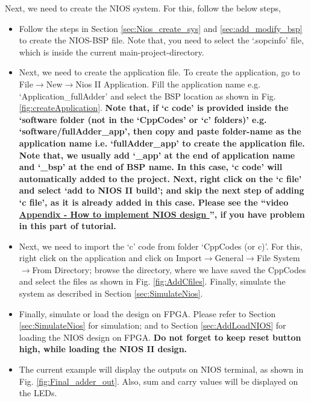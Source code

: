 Next, we need to create the NIOS system. For this, follow the below steps, 
\begin{itemize}
	\item Follow the steps in Section \ref{sec:Nios_create_sys} and \ref{sec:add_modify_bsp} to create the NIOS-BSP file. Note that, you need to select the `.sopcinfo' file, which is inside the current main-project-directory.  

	\item Next, we need to create the application file. To create the application, go to File$\rightarrow$New$\rightarrow$Nios II Application. Fill the application name e.g. `Application\_fullAdder' and select the BSP location as shown in Fig. \ref{fig:createApplication}. \textbf{Note that, if `c code' is provided inside the `software folder (not in the `CppCodes' or `c' folders)' e.g. `software/fullAdder\_app', then copy and paste folder-name as the application name i.e. `fullAdder\_app' to create the application file. Note that, we usually add `\_app' at the end of application name and `\_bsp' at the end of BSP name. In this case, `c code' will automatically added to the project. Next, right click on the `c file' and select `add to NIOS II build'; and skip the next step of adding `c file', as it is already added in this case. Please see the ``video \href{https://www.youtube.com/playlist?list=PLpqu8JfoNKiNJpFvKTeBlI-LMzc2TAlRM}{Appendix - How to implement NIOS design }'', if you have problem in this part of tutorial.}
	

	\item Next, we need to import the `c' code from folder `CppCodes (or c)'. For this, right click on the application and click on Import$\rightarrow$General$\rightarrow$File System$\rightarrow$From Directory; browse the directory, where we have saved  the CppCodes  and select the files as shown in Fig. \ref{fig:AddCfiles}. Finally, simulate the system as described in Section \ref{sec:SimulateNios}.
	
	\item Finally, simulate or load the design on FPGA. Please refer to Section \ref{sec:SimulateNios} for simulation; and to Section \ref{sec:AddLoadNIOS} for loading the NIOS design on FPGA. \textbf{Do not forget to keep reset button high, while loading the NIOS II design.} 
	
	\item The current example will display the outputs on NIOS terminal, as shown in Fig. \ref{fig:Final_adder_out}. Also, sum and carry values will be displayed on the LEDs.  
	
	
\end{itemize}

